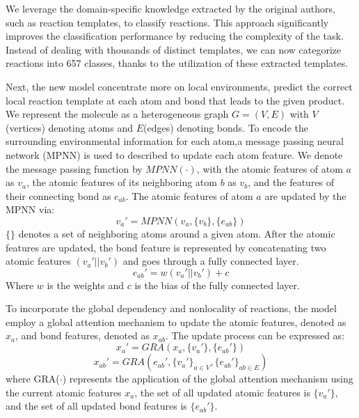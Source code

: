 \documentclass{article}
\begin{document}
We leverage the domain-specific knowledge extracted by the original authors, such as reaction templates, to classify reactions. This approach significantly improves the classification performance by reducing the complexity of the task. Instead of dealing with thousands of distinct templates, we can now categorize reactions into 657 classes, thanks to the utilization of these extracted templates.

Next, the new model concentrate more on local environments,  predict the correct local reaction template at each atom and bond that leads to the given product. We represent the molecule as a heterogeneous graph $G = (V,E)$ with $V$(vertices) denoting atoms and $E $(edges) denoting bonds. To encode the surrounding environmental information for each atom,a message passing neural network (MPNN) is used to described to update each atom feature. We denote the message passing function by $MPNN(\cdot)$, with the atomic features of atom $a$ as $v_a$, the atomic features of its neighboring atom $b$ as $v_b$, and the features of their connecting bond as $e_{ab}$. The atomic features of atom $a$ are updated by the MPNN via:
\begin{equation}
  v_a' = MPNN(v_a, \{v_b\}, \{e_{ab}\})
\end{equation}
$\{ \}$ denotes a set of neighboring atoms around a given atom. After the atomic features are updated, the bond feature is represented by concatenating two atomic features  $(v_a' || v_b')$ and goes through a fully connected layer.
\begin{equation}
e_{ab}' = w(v_a' || v_b') + c
\end{equation}
Where  $w$ is the weights and $ c$  is the bias of the fully connected layer.

To incorporate the global dependency and nonlocality of reactions, the model employ a global attention mechanism to update the atomic features, denoted as $x_a$, and bond features, denoted as $x_{ab}$. The update process can be expressed as:
\begin{equation}
x_a' = GRA(x_a, \{v_a'\}, \{e_{ab}'\})
\end{equation}
\begin{equation}
x_{ab}' = GRA(e_{ab}', \{v_a'\}_{a \in V}, \{e_{ab}'\}_{ab \in E})
\end{equation}
where GRA($\cdot$) represents the application of the global attention mechanism using the current atomic features $x_a$, the set of all updated atomic features is $\{v_a'\}$, and the set of all updated bond features is $\{e_{ab}'\}$.
\end{document}
